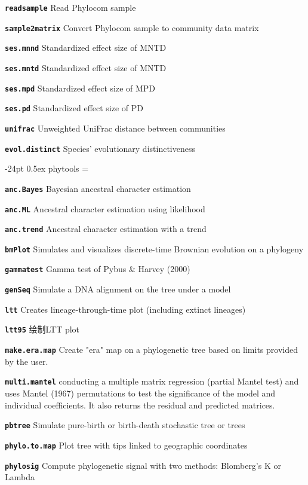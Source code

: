 \documentclass[10pt,landscape]{article}
\makeatletter
\renewcommand\section{\@startsection{section}{1}{0mm}%
                                     {-24pt}%
                                     {0.5ex}%
                                {\color{blue}\normalfont\large\bfseries}}
\newcommand{\bcode}[1]{\texttt{\textbf{#1}}}
\makeatother
\begin{document}
\begin{CJK}{UTF8}{gbsn}
\begin{multicols}{3}
\bcode{readsample}  Read Phylocom sample

\bcode{sample2matrix}  Convert Phylocom sample to community data matrix

\bcode{ses.mnnd}    Standardized effect size of MNTD

\bcode{ses.mntd}    Standardized effect size of MNTD

\bcode{ses.mpd} Standardized effect size of MPD

\bcode{ses.pd}  Standardized effect size of PD

\bcode{unifrac} Unweighted UniFrac distance between communities

\bcode{evol.distinct}   Species' evolutionary distinctiveness


\section{phytools}
\everypar={\hangindent=9mm}

\bcode{anc.Bayes}   Bayesian ancestral character estimation

\bcode{anc.ML}  Ancestral character estimation using likelihood

\bcode{anc.trend}   Ancestral character estimation with a trend

\bcode{bmPlot} Simulates and visualizes discrete-time Brownian evolution on a phylogeny

\bcode{gammatest} Gamma test of Pybus \& Harvey (2000)

\bcode{genSeq} Simulate a DNA alignment on the tree under a model

\bcode{ltt} Creates lineage-through-time plot (including extinct lineages)

\bcode{ltt95} 绘制LTT plot

\bcode{make.era.map} Create "era" map on a phylogenetic tree based on limits provided by the user.

\bcode{multi.mantel} conducting a multiple matrix regression (partial Mantel test) and uses Mantel (1967) permutations to test the significance of the model and individual coefficients. It also returns the residual and predicted matrices.

\bcode{pbtree} Simulate pure-birth or birth-death stochastic tree or trees

\bcode{phylo.to.map} Plot tree with tips linked to geographic coordinates

\bcode{phylosig} Compute phylogenetic signal with two methods: Blomberg's K or Lambda


\end{multicols}
\end{CJK}
\end{document}
